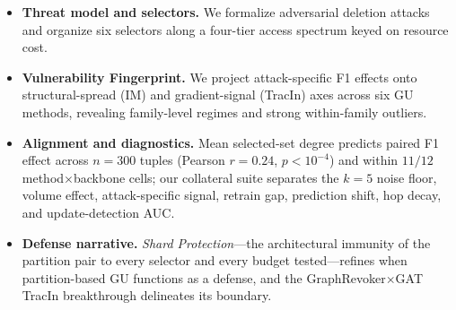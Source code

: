 \begin{itemize}[leftmargin=1.2em,topsep=2pt,itemsep=2pt]
  \item \textbf{Threat model and selectors.} We formalize adversarial
        deletion attacks and organize six selectors along a four-tier
        access spectrum keyed on resource cost.
  \item \textbf{Vulnerability Fingerprint.} We project attack-specific F1
        effects onto structural-spread (IM) and gradient-signal (TracIn)
        axes across six GU methods, revealing family-level regimes and
        strong within-family outliers.
  \item \textbf{Alignment and diagnostics.} Mean selected-set degree
        predicts paired F1 effect across $n{=}300$ tuples (Pearson
        $r{=}0.24$, $p{<}10^{-4}$) and within $11/12$
        method$\times$backbone cells; our collateral suite separates the
        $k{=}5$ noise floor, volume effect, attack-specific signal,
        retrain gap, prediction shift, hop decay, and update-detection
        AUC.
  \item \textbf{Defense narrative.} \emph{Shard Protection}---the
        architectural immunity of the partition pair to every selector
        and every budget tested---refines when partition-based GU
        functions as a defense, and the GraphRevoker$\times$GAT
        TracIn breakthrough delineates its boundary.
\end{itemize}

